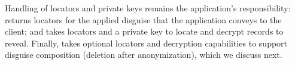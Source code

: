 %
Handling of locators and private keys remains the application's responsibility:
 returns locators for the applied disguise that the
application conveys to the client; and  takes locators and a
private key to locate and decrypt records to reveal.
%
Finally,  takes optional locators and decryption capabilities
to support disguise composition (\eg deletion after anonymization), which
we discuss next.
%
